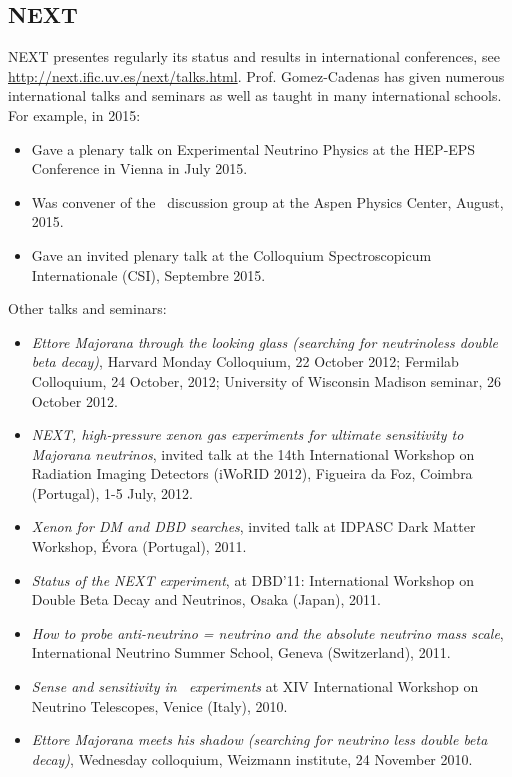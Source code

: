\documentclass[a4paper,11pt,oneside]{article}
\begin{document}
\subsection*{NEXT}
NEXT presentes regularly its status and results in international conferences, see
\url{http://next.ific.uv.es/next/talks.html}. Prof. Gomez-Cadenas has given numerous international talks and seminars as well as
taught in many international schools. For example, in 2015:

\begin{itemize}
\item Gave a plenary talk on Experimental Neutrino Physics
at the HEP-EPS Conference in Vienna in July 2015.
\item Was convener of the \bbonu\ discussion group at the Aspen Physics Center, August, 2015.
\item Gave an invited plenary talk at the Colloquium Spectroscopicum Internationale (CSI), Septembre 2015.
\end{itemize}

Other talks and seminars:

\begin{itemize}
\item \textit{Ettore Majorana through the looking glass (searching for neutrinoless double beta decay)}, Harvard Monday Colloquium, 22 October 2012; Fermilab Colloquium, 24 October, 2012; University of Wisconsin Madison seminar, 26 October 2012.
\item \textit{NEXT, high-pressure xenon gas experiments for ultimate sensitivity to Majorana neutrinos}, invited talk at the 14th International Workshop on Radiation Imaging Detectors (iWoRID 2012), Figueira da Foz, Coimbra (Portugal), 1-5 July, 2012. 
\item \textit{Xenon for DM and DBD searches}, invited talk at IDPASC Dark Matter Workshop, \'Evora (Portugal), 2011.
\item \textit{Status of the NEXT experiment}, at DBD'11: International Workshop on Double Beta Decay and Neutrinos, Osaka (Japan), 2011.
\item \textit{How to probe anti-neutrino = neutrino and the absolute neutrino mass scale}, International Neutrino Summer School, Geneva (Switzerland), 2011.
\item \textit{Sense and sensitivity in \bbonu\ experiments} at XIV International Workshop on Neutrino Telescopes, Venice (Italy), 2010.
\item {\it Ettore Majorana meets his shadow (searching for neutrino less double beta decay)}, Wednesday colloquium, Weizmann institute, 24 November 2010.
\end{itemize}
\end{document}
